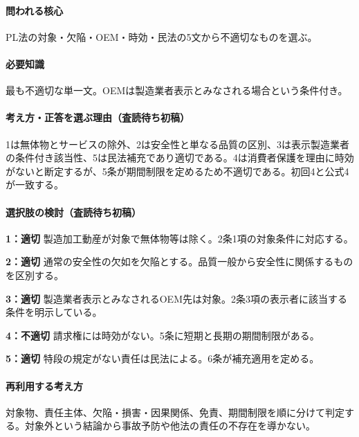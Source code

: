 \paragraph{問われる核心} PL法の対象・欠陥・OEM・時効・民法の5文から不適切なものを選ぶ。

\paragraph{必要知識} 最も不適切な単一文。OEMは製造業者表示とみなされる場合という条件付き。

\paragraph{考え方・正答を選ぶ理由（査読待ち初稿）} 1は無体物とサービスの除外、2は安全性と単なる品質の区別、3は表示製造業者の条件付き該当性、5は民法補充であり適切である。4は消費者保護を理由に時効がないと断定するが、5条が期間制限を定めるため不適切である。初回4と公式4が一致する。

\paragraph{選択肢の検討（査読待ち初稿）}\mbox{}\par

\noindent\textbf{1：適切} 製造加工動産が対象で無体物等は除く。2条1項の対象条件に対応する。\par

\noindent\textbf{2：適切} 通常の安全性の欠如を欠陥とする。品質一般から安全性に関係するものを区別する。\par

\noindent\textbf{3：適切} 製造業者表示とみなされるOEM先は対象。2条3項の表示者に該当する条件を明示している。\par

\noindent\textbf{4：不適切} 請求権には時効がない。5条に短期と長期の期間制限がある。\par

\noindent\textbf{5：適切} 特段の規定がない責任は民法による。6条が補充適用を定める。\par

\paragraph{再利用する考え方} 対象物、責任主体、欠陥・損害・因果関係、免責、期間制限を順に分けて判定する。対象外という結論から事故予防や他法の責任の不存在を導かない。

